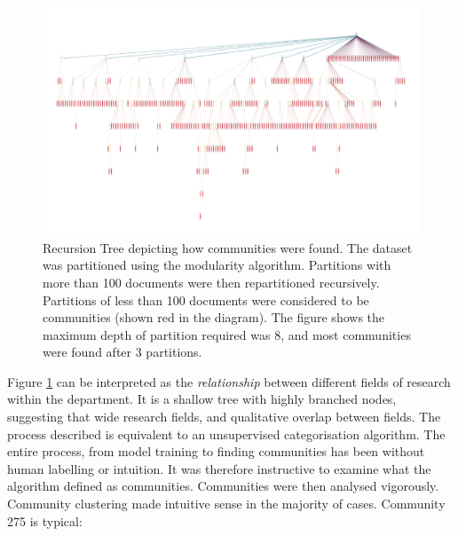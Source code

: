 \begin{center}
\begin{figure}[H]
\label{fig:COMMTREE}
  \centering
    \includegraphics[scale=0.5]{Analysis/comms.png}
    \caption{Recursion Tree depicting how communities were found. The dataset was partitioned using the modularity algorithm. Partitions with more than 100 documents were then repartitioned recursively. Partitions of less than 100 documents were considered to be communities (shown red in the diagram). The figure shows the maximum depth of partition required was 8, and most communities were found after 3 partitions.}
\end{figure} 
\end{center}
Figure \ref{fig:COMMTREE} can be interpreted as the \emph{relationship} between different fields of research within the department. It is a shallow tree with highly branched nodes, suggesting that wide research fields, and qualitative overlap between fields.
The process described is equivalent to an unsupervised categorisation algorithm. The entire process, from model training to finding communities has been without human labelling or intuition. It was therefore instructive to examine what the algorithm defined as communities.
Communities were then analysed vigorously. Community clustering made intuitive sense in the majority of cases. Community 275 is typical:
